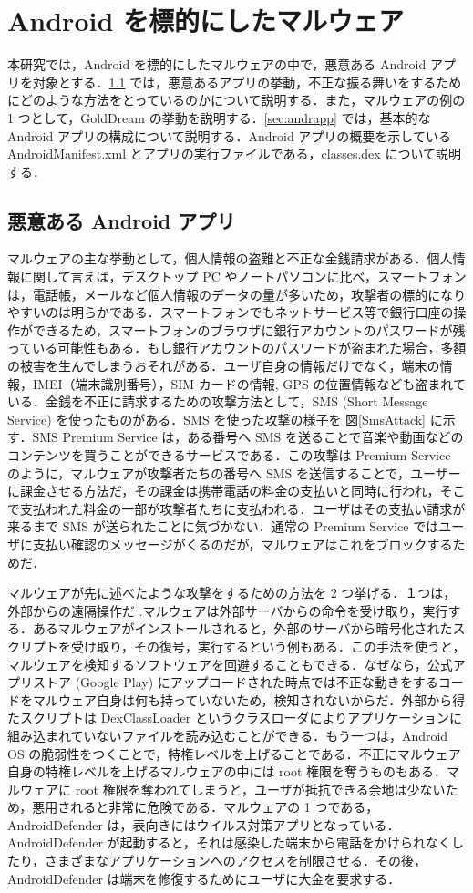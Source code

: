 \section{Android  を標的にしたマルウェア}
本研究では，Android を標的にしたマルウェアの中で，悪意ある Android アプリを対象とする．\ref{sec:malware} では，悪意あるアプリの挙動，不正な振る舞いをするためにどのような方法をとっているのかについて説明する．また，マルウェアの例の 1 つとして，GoldDream の挙動を説明する．\ref{sec:andrapp} では，基本的な Android アプリの構成について説明する．Android アプリの概要を示している AndroidManifest.xml とアプリの実行ファイルである，classes.dex について説明する．
\subsection{悪意ある Android  アプリ}
\label{sec:malware}
マルウェアの主な挙動として，個人情報の盗難と不正な金銭請求がある．個人情報に関して言えば，デスクトップ PC やノートパソコンに比べ，スマートフォンは，電話帳，メールなど個人情報のデータの量が多いため，攻撃者の標的になりやすいのは明らかである．スマートフォンでもネットサービス等で銀行口座の操作ができるため，スマートフォンのブラウザに銀行アカウントのパスワードが残っている可能性もある．もし銀行アカウントのパスワードが盗まれた場合，多額の被害を生んでしまうおそれがある．ユーザ自身の情報だけでなく，端末の情報，IMEI（端末識別番号），SIM カードの情報, GPS の位置情報なども盗まれている．金銭を不正に請求するための攻撃方法として，SMS (Short Message Service) を使ったものがある．SMS を使った攻撃の様子を 図\ref{SmsAttack} に示す．SMS Premium Service は，ある番号へ SMS を送ることで音楽や動画などのコンテンツを買うことができるサービスである．この攻撃は Premium Service のように，マルウェアが攻撃者たちの番号へ SMS を送信することで，ユーザーに課金させる方法だ，その課金は携帯電話の料金の支払いと同時に行われ，そこで支払われた料金の一部が攻撃者たちに支払われる．ユーザはその支払い請求が来るまで SMS が送られたことに気づかない．通常の Premium Service ではユーザに支払い確認のメッセージがくるのだが，マルウェアはこれをブロックするためだ．

マルウェアが先に述べたような攻撃をするための方法を 2 つ挙げる．１つは，外部からの遠隔操作だ  \cite{remotectrl} .マルウェアは外部サーバからの命令を受け取り，実行する．あるマルウェアがインストールされると，外部のサーバから暗号化されたスクリプトを受け取り，その復号，実行するという例もある．この手法を使うと，マルウェアを検知するソフトウェアを回避することもできる．なぜなら，公式アプリストア (Google Play)  にアップロードされた時点では不正な動きをするコードをマルウェア自身は何も持っていないため，検知されないからだ．外部から得たスクリプトは DexClassLoader というクラスローダによりアプリケーションに組み込まれていないファイルを読み込むことができる．もう一つは，Android OS の脆弱性をつくことで，特権レベルを上げることである．不正にマルウェア自身の特権レベルを上げるマルウェアの中には root 権限を奪うものもある．マルウェアに root 権限を奪われてしまうと，ユーザが抵抗できる余地は少ないため，悪用されると非常に危険である．マルウェアの 1 つである，AndroidDefender \cite{sopho} は，表向きにはウイルス対策アプリとなっている．AndroidDefender が起動すると，それは感染した端末から電話をかけられなくしたり，さまざまなアプリケーションへのアクセスを制限させる．その後，AndroidDefender は端末を修復するためにユーザに大金を要求する．
 
